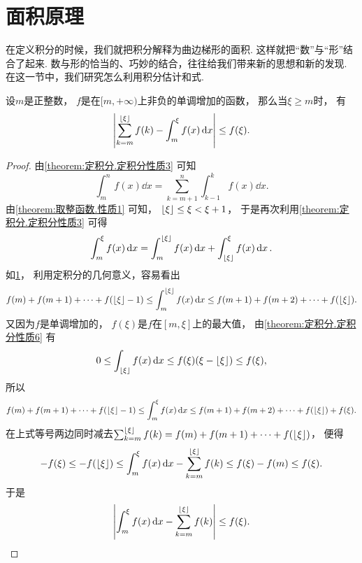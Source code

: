 \section{面积原理}
在定义积分的时候，我们就把积分解释为曲边梯形的面积.
这样就把“数”与“形”结合了起来.
数与形的恰当的、巧妙的结合，往往给我们带来新的思想和新的发现.
在这一节中，我们研究怎么利用积分估计和式.

\begin{figure}[htb]
	\centering
	\caption{}
	\label{figure:面积原理.定积分与曲边梯形面积的联系}
\end{figure}

\begin{theorem}
设\(m\)是正整数，
\(f\)是在\([m,+\infty)\)上非负的单调增加的函数，
那么当\(\xi \geq m\)时，
有\[
	\abs{
		\sum_{k=m}^{\lfloor\xi\rfloor} f(k)
		- \int_m^\xi f(x) \dd{x}
	} \leq f(\xi).
\]
\begin{proof}
由\cref{theorem:定积分.定积分性质3} 可知\[
	\int_m^n f(x) \dd{x}
	= \sum_{k=m+1}^n \int_{k-1}^k f(x) \dd{x}.
\]
由\cref{theorem:取整函数.性质1} 可知，
\(\lfloor\xi\rfloor \leq \xi < \xi + 1\)，
于是再次利用\cref{theorem:定积分.定积分性质3} 可得\[
	\int_m^\xi f(x) \dd{x}
	= \int_m^{\lfloor\xi\rfloor} f(x) \dd{x}
	+ \int_{\lfloor\xi\rfloor}^\xi f(x) \dd{x}.
\]
如\cref{figure:面积原理.定积分与曲边梯形面积的联系}，
利用定积分的几何意义，容易看出\[
	f(m) + f(m+1) + \dotsb + f(\lfloor\xi\rfloor-1)
	\leq \int_m^{\lfloor\xi\rfloor} f(x) \dd{x}
	\leq f(m+1) + f(m+2) + \dotsb + f(\lfloor\xi\rfloor).
\]
又因为\(f\)是单调增加的，
\(f(\xi)\)是\(f\)在\([m,\xi]\)上的最大值，
由\cref{theorem:定积分.定积分性质6} 有\[
	0 \leq \int_{\lfloor\xi\rfloor} f(x) \dd{x}
	\leq f(\xi) (\xi - \lfloor\xi\rfloor)
	\leq f(\xi),
\]
所以\[
	f(m) + f(m+1) + \dotsb + f(\lfloor\xi\rfloor-1)
	\leq \int_m^\xi f(x) \dd{x}
	\leq f(m+1) + f(m+2) + \dotsb + f(\lfloor\xi\rfloor) + f(\xi).
\]
在上式等号两边同时减去\(\sum_{k=m}^{\lfloor\xi\rfloor} f(k)
= f(m) + f(m+1) + \dotsb + f(\lfloor\xi\rfloor)\)，
便得\[
	-f(\xi)
	\leq -f(\lfloor\xi\rfloor)
	\leq \int_m^\xi f(x) \dd{x} - \sum_{k=m}^{\lfloor\xi\rfloor} f(k)
	\leq f(\xi) - f(m)
	\leq f(\xi).
\]
于是\[
	\abs{\int_m^\xi f(x) \dd{x} - \sum_{k=m}^{\lfloor\xi\rfloor} f(k)} \leq f(\xi).
	\qedhere
\]
\end{proof}
\end{theorem}

